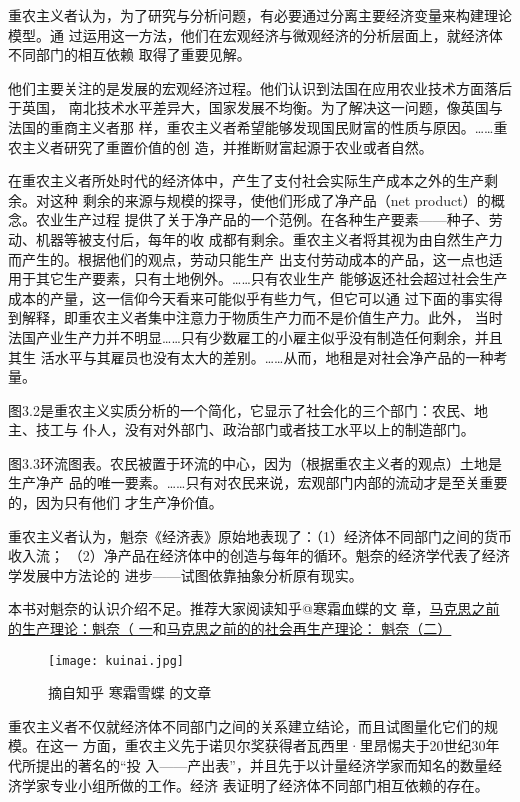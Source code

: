 重农主义者认为，为了研究与分析问题，有必要通过分离主要经济变量来构建理论模型。通
过运用这一方法，他们在宏观经济与微观经济的分析层面上，就经济体不同部门的相互依赖
取得了重要见解。

他们主要关注的是发展的宏观经济过程。他们认识到法国在应用农业技术方面落后于英国，
南北技术水平差异大，国家发展不均衡。为了解决这一问题，像英国与法国的重商主义者那
样，重农主义者希望能够发现国民财富的性质与原因。……重农主义者研究了重置价值的创
造，并推断财富起源于农业或者自然。

在重农主义者所处时代的经济体中，产生了支付社会实际生产成本之外的生产剩余。对这种
剩余的来源与规模的探寻，使他们形成了净产品（net product）的概念。农业生产过程
提供了关于净产品的一个范例。在各种生产要素——种子、劳动、机器等被支付后，每年的收
成都有剩余。重农主义者将其视为由自然生产力而产生的。根据他们的观点，劳动只能生产
出支付劳动成本的产品，这一点也适用于其它生产要素，只有土地例外。……只有农业生产
能够返还社会超过社会生产成本的产量，这一信仰今天看来可能似乎有些力气，但它可以通
过下面的事实得到解释，即重农主义者集中注意力于物质生产力而不是价值生产力。此外，
当时法国产业生产力并不明显……只有少数雇工的小雇主似乎没有制造任何剩余，并且其生
活水平与其雇员也没有太大的差别。……从而，地租是对社会净产品的一种考量。

图3.2是重农主义实质分析的一个简化，它显示了社会化的三个部门：农民、地主、技工与
仆人，没有对外部门、政治部门或者技工水平以上的制造部门。

图3.3环流图表。农民被置于环流的中心，因为（根据重农主义者的观点）土地是生产净产
品的唯一要素。……只有对农民来说，宏观部门内部的流动才是至关重要的，因为只有他们
才生产净价值。

重农主义者认为，魁奈《经济表》原始地表现了：（1）经济体不同部门之间的货币收入流；
（2）净产品在经济体中的创造与每年的循环。魁奈的经济学代表了经济学发展中方法论的
进步——试图依靠抽象分析原有现实。

本书对魁奈的认识介绍不足。推荐大家阅读知乎@寒霜血蝶的文
章，\href{https://zhuanlan.zhihu.com/p/28194917}{马克思之前的生产理论：魁奈（
  一}和\href{https://zhuanlan.zhihu.com/p/28210526}{马克思之前的的社会再生产理论：
  魁奈（二）}

\begin{figure}[ht]
  \centering
  \texttt{[image: kuinai.jpg]}
  \caption{\label{fig:label}摘自知乎 寒霜雪蝶 的文章 }
\end{figure}

重农主义者不仅就经济体不同部门之间的关系建立结论，而且试图量化它们的规模。在这一
方面，重农主义先于诺贝尔奖获得者瓦西里·里昂惕夫于20世纪30年代所提出的著名的“投
入——产出表”，并且先于以计量经济学家而知名的数量经济学家专业小组所做的工作。经济
表证明了经济体不同部门相互依赖的存在。

